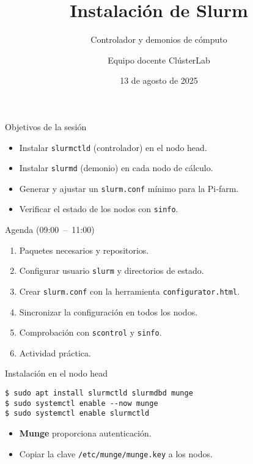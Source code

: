 \documentclass[aspectratio=169,professionalfonts]{beamer}
\title[ClústerLab • Día 5]{Instalación de Slurm}
\subtitle{Controlador y demonios de cómputo}
\author{Equipo docente ClústerLab}
\date{13 de agosto de 2025}
\begin{document}
\begin{frame}[plain]
  \titlepage
\end{frame}

\begin{frame}[fragile]{Objetivos de la sesión}
  \begin{itemize}
    \item Instalar \texttt{slurmctld} (controlador) en el nodo head.
    \item Instalar \texttt{slurmd} (demonio) en cada nodo de cálculo.
    \item Generar y ajustar un \texttt{slurm.conf} mínimo para la Pi‑farm.
    \item Verificar el estado de los nodos con \texttt{sinfo}.
  \end{itemize}
\end{frame}

\begin{frame}[fragile]{Agenda (09:00 – 11:00)}
  \begin{enumerate}
    \item Paquetes necesarios y repositorios.
    \item Configurar usuario \texttt{slurm} y directorios de estado.
    \item Crear \texttt{slurm.conf} con la herramienta \texttt{configurator.html}.
    \item Sincronizar la configuración en todos los nodos.
    \item Comprobación con \texttt{scontrol} y \texttt{sinfo}.
    \item Actividad práctica.
  \end{enumerate}
\end{frame}

\begin{frame}[fragile]{Instalación en el nodo head}
  \begin{verbatim}
$ sudo apt install slurmctld slurmdbd munge
$ sudo systemctl enable --now munge
$ sudo systemctl enable slurmctld
  \end{verbatim}
  \begin{itemize}
    \item \textbf{Munge} proporciona autenticación.
    \item Copiar la clave \texttt{/etc/munge/munge.key} a los nodos.
  \end{itemize}
\end{frame}
\end{document}
